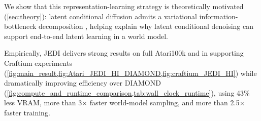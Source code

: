 \documentclass{article}
\begin{document}
We show that this representation-learning strategy is theoretically motivated (\cref{sec:theory}): latent conditional diffusion admits a variational information-bottleneck decomposition \citep{alemi2016deepVarIB, tishby2000information, shwartz2017opening}, helping explain why latent conditional denoising can support end-to-end latent learning in a world model. 

Empirically, JEDI delivers strong results on full Atari100k \citep{kaiser2019Atari100kSimPLE} and in supporting Craftium \citep{malagon2024craftium} experiments (\cref{fig:main_result,fig:Atari_JEDI_HI_DIAMOND,fig:craftium_JEDI_HI}) while dramatically improving efficiency over DIAMOND (\cref{fig:compute_and_runtime_comparison,tab:wall_clock_runtime}), using 43\% less VRAM, more than 3$\times$ faster world-model sampling, and more than 2.5$\times$ faster training.
\end{document}
